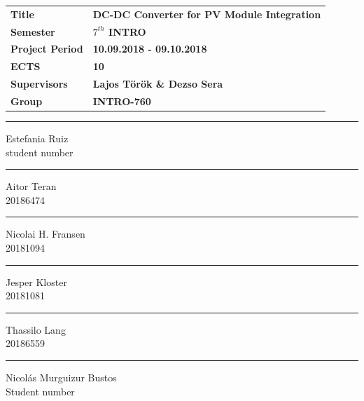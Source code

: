 \vspace*{1cm}
\begin{table}[H]
	\begin{tabular}{l l} 
		\textbf{Title} &  \textbf{DC-DC Converter for PV Module Integration} \\ 
		\textbf{Semester} & \textbf{$7^{th}$ INTRO}  \\ 
		\textbf{Project Period} & \textbf{10.09.2018 - 09.10.2018}  \\ 
		\textbf{ECTS} &  \textbf{10}\\ 
		\textbf{Supervisors} & \textbf{Lajos Török \& Dezso Sera}  \\ 
		\textbf{Group} & \textbf{INTRO-760}  \\ 
	\end{tabular}
\end{table}

\vspace*{2cm}
\begin{center}	
	\vspace{40pt}
	\begin{minipage}{0.4\linewidth}
		\centering
		\hrule
		\vspace{12pt}
		Estefania Ruiz\\ 
		student number
	\end{minipage}
	\hspace{10pt}
	\vspace{40pt}
	\begin{minipage}{0.4\linewidth}
		\centering
		\hrule
		\vspace{12pt}
		Aitor Teran\\ 
		20186474	
	\end{minipage}
	\hspace{10pt}
	\vspace{40pt}
	\begin{minipage}{0.4\linewidth}
		\centering
		\hrule
		\vspace{12pt}
		Nicolai H. Fransen\\
		20181094
	\end{minipage}
	\hspace{10pt}
	\begin{minipage}{0.4\linewidth}
		\centering
		\hrule
		\vspace{12pt}
		Jesper Kloster\\
		20181081 
	\end{minipage}
	\hspace{10pt}
	\begin{minipage}{0.4\linewidth}
		\centering
		\hrule
		\vspace{12pt}
		Thassilo Lang\\ 
		20186559 
	\end{minipage}
	\hspace{10pt}
	\vspace{20pt}
	\begin{minipage}{0.4\linewidth}
		\centering
		\hrule
		\vspace{12pt}
		Nicolás Murguizur Bustos\\ 
		Student number %
	\end{minipage}
\end{center}

